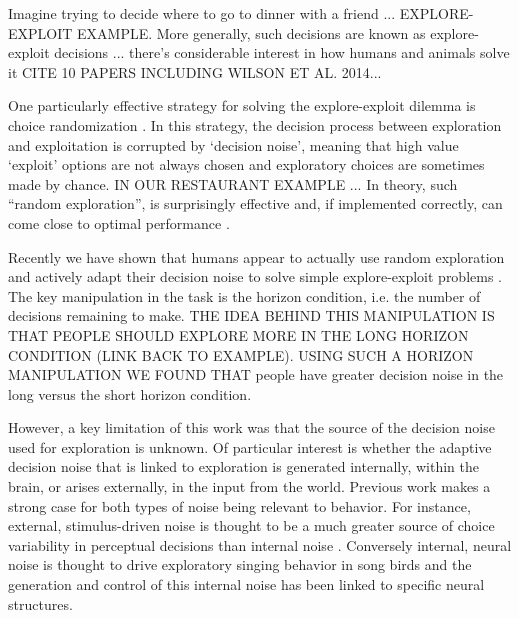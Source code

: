 \documentclass[12pt]{article}
\begin{document}
	Imagine  trying to decide where to go to dinner with a friend ... EXPLORE-EXPLOIT EXAMPLE.  More generally, such decisions are known as explore-exploit decisions ... there's considerable interest in how humans and animals solve it CITE 10 PAPERS INCLUDING WILSON ET AL. 2014...
	
	
	
	One particularly effective strategy for solving the explore-exploit dilemma is choice randomization \cite{}. In this strategy, the decision process between exploration and exploitation is corrupted by `decision noise', meaning that high value `exploit' options are not always chosen and exploratory choices are sometimes made by chance. IN OUR RESTAURANT EXAMPLE ... In theory, such “random exploration”, is surprisingly effective and, if implemented correctly, can come close to optimal performance \cite{}. 
	
	Recently we have shown that humans appear to actually use random exploration and actively adapt their decision noise to solve simple explore-exploit problems \cite{}.  The key manipulation in the task is the horizon condition, i.e. the number of decisions remaining to make. THE IDEA BEHIND THIS MANIPULATION IS THAT PEOPLE SHOULD EXPLORE MORE IN THE LONG HORIZON CONDITION (LINK BACK TO EXAMPLE).  USING SUCH A HORIZON MANIPULATION WE FOUND THAT  people have greater decision noise in the long versus the short horizon condition. 
	
	However, a key limitation of this work was that the source of the decision noise used for exploration is unknown. Of particular interest is whether the adaptive decision noise that is linked to exploration is generated internally, within the brain, or arises externally, in the input from the world. Previous work makes a strong case for both types of noise being relevant to behavior. For instance, external, stimulus-driven noise is thought to be a much greater source of choice variability in perceptual decisions than internal noise \cite{}. Conversely internal, neural noise is thought to drive exploratory singing behavior in song birds \cite{} and the generation and control of this internal noise has been linked to specific neural structures. 
	
\end{document}

